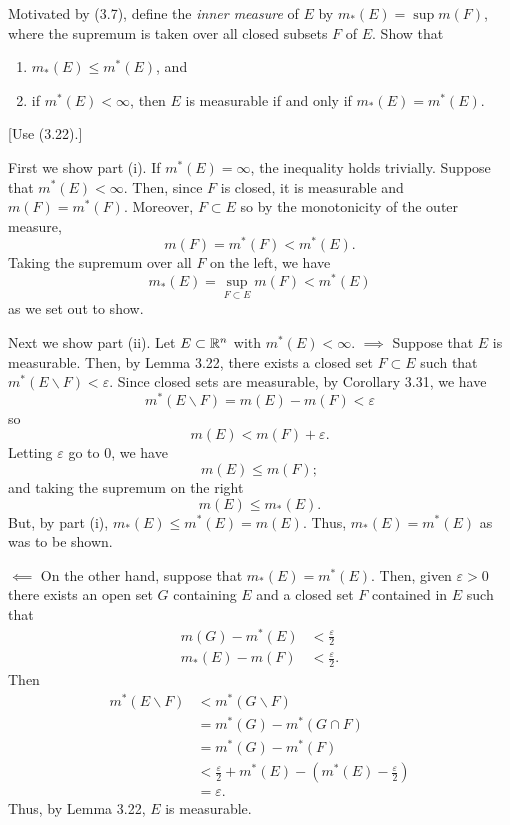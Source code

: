 \begin{problem}
  Motivated by (3.7), define the \emph{inner measure} of $E$ by
  $m_*(E)=\sup m(F)$, where the supremum is taken over all closed subsets
  $F$ of $E$. Show that
  \begin{enumerate}[label=(\roman*),noitemsep]
  \item $m_*(E)\leq m^*(E)$, and
  \item if $m^*(E)<\infty$, then $E$ is measurable if and only if
    $m_*(E)=m^*(E)$.
  \end{enumerate} [Use (3.22).]
\end{problem}
\begin{solution}
  First we show part (i). If $m^*(E)=\infty$, the inequality holds
  trivially. Suppose that $m^*(E)<\infty$. Then, since $F$ is closed, it is
  measurable and $m(F)=m^*(F)$. Moreover, $F\subset E$ so by the
  monotonicity of the outer measure,
  \[
    m(F)=m^*(F)<m^*(E).
  \]
  Taking the supremum over all $F$ on the left, we have
  \[
    m_*(E)=\sup_{F\subset E}m(F)<m^*(E)
  \]
  as we set out to show.

  Next we show part (ii). Let $E\subset\mathbb{R}^n$ with
  $m^*(E)<\infty$. $\implies$ Suppose that $E$ is measurable. Then, by
  Lemma 3.22, there exists a closed set $F\subset E$ such that
  $m^*(E\smallsetminus F)<\varepsilon$. Since closed sets are measurable,
  by Corollary 3.31, we have
  \[
    m^*(E\smallsetminus F)=m(E)-m(F)<\varepsilon
  \]
  so
  \[
    m(E)<m(F)+\varepsilon.
  \]
  Letting $\varepsilon$ go to $0$, we have
  \[
    m(E)\leq m(F);
  \]
  and taking the supremum on the right
  \[
    m(E)\leq m_*(E).
  \]
  But, by part (i), $m_*(E)\leq m^*(E)=m(E)$. Thus, $m_*(E)=m^*(E)$ as was
  to be shown.

  $\impliedby$ On the other hand, suppose that $m_*(E)=m^*(E)$. Then, given
  $\varepsilon>0$ there exists an open set $G$ containing $E$ and a closed
  set $F$ contained in $E$ such that
  \begin{align*}
    m(G)-m^*(E)&<\frac{\varepsilon}{2}\\
    m_*(E)-m(F)&<\frac{\varepsilon}{2}.
  \end{align*}
  Then
  \begin{align*}
    m^*(E\smallsetminus F)
    &<m^*(G\smallsetminus F)\\
    &=m^*(G)-m^*(G\cap F)\\
    &=m^*(G)-m^*(F)\\
    &<\frac{\varepsilon}{2}+m^*(E)-\left(m^*(E)-\frac{\varepsilon}{2}\right)\\
    &=\varepsilon.
  \end{align*}
  Thus, by Lemma 3.22, $E$ is measurable.
\end{solution}

